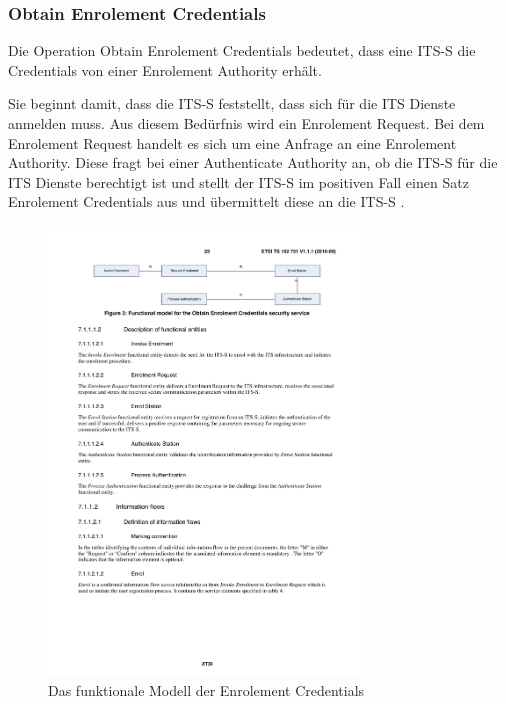  
\subsubsection{Obtain Enrolement Credentials \label{architektur_obtainEnrolementCredentials}}
Die Operation Obtain Enrolement Credentials bedeutet, dass eine \ac{ITS-S} die Credentials von einer Enrolement Authority erhält. 

Sie beginnt damit, dass die \ac{ITS-S} feststellt, dass sich für die \ac{ITS} Dienste anmelden muss. Aus diesem Bedürfnis wird ein Enrolement Request. Bei dem Enrolement Request handelt es sich um eine Anfrage an eine Enrolement Authority. Diese fragt bei einer Authenticate Authority an, ob die \ac{ITS-S} für die \ac{ITS} Dienste berechtigt ist und stellt der \ac{ITS-S} im positiven Fall einen Satz Enrolement Credentials aus und übermittelt diese an die \ac{ITS-S} .  

\begin{figure}[h]
	\includegraphics[width=0.75\textwidth]{content/images/02_architektur/enrolementFunktionaleKomponenten.pdf}
	\caption{Das funktionale Modell der Enrolement Credentials \cite{ts102731}}
	\label{fig:architektur_enrolementFunktionalModel}
\end{figure}

